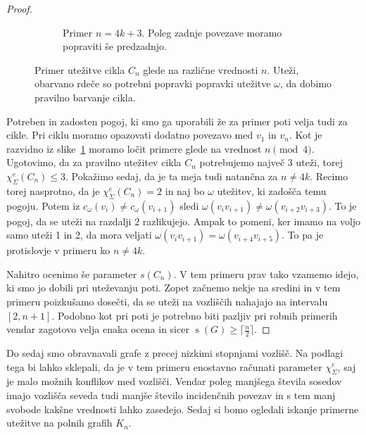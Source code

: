 \documentclass[12pt,a4paper,twoside]{article}
\theoremstyle{definition} %
\theoremstyle{plain} %
\newcommand{\ec}{\chi_{\Sigma}^e}
\numberwithin{equation}{section}  %
\DeclareMathOperator{\s}{s}
\begin{document}
\begin{proof}
\begin{figure}[]
\begin{subfigure}{0.475\textwidth}
		\caption{Primer $n = 4k + 3$. Poleg zadnje povezave moramo popraviti še predzadnjo.}
	\end{subfigure}
\caption{Primer utežitve cikla $C_n$ glede na različne vrednosti $n$. Uteži, obarvano rdeče so potrebni popravki popravki utežitve $\omega$, da dobimo pravilno barvanje cikla.}
\label{fig:cnall}
\end{figure}
Potreben in zadosten pogoj, ki smo ga uporabili že za primer poti velja tudi za cikle. Pri ciklu moramo opazovati dodatno povezavo med $v_1$ in $v_n$. Kot je razvidno iz slike~\ref{fig:cnall} moramo ločit primere glede na vrednost $n \pmod{4}$. Ugotovimo, da za pravilno utežitev cikla $C_n$ potrebujemo največ 3 uteži, torej $\ec(C_n) \le 3$. Pokažimo sedaj, da je ta meja tudi natančna za $n \neq 4k$. Recimo torej nasprotno, da je $\ec(C_n) = 2$ in naj bo $\omega$ utežitev, ki zadošča temu pogoju. Potem iz $c_{\omega}(v_i) \neq c_{\omega}(v_{i+1})$ sledi $\omega(v_i v_{i+1}) \neq \omega({v_{i+2} v_{i+3}})$. To je pogoj, da se uteži na razdalji $2$ razlikujejo. Ampak to pomeni, ker imamo na voljo samo uteži 1 in 2, da mora veljati $\omega(v_i v_{i+1}) = \omega({v_{i+4} v_{i+5}})$. To pa je protislovje v primeru ko $n \neq 4k$.

Nahitro ocenimo še parameter $s(C_n)$. V tem primeru prav tako vzamemo idejo, ki smo jo dobili pri uteževanju poti. Zopet začnemo nekje na sredini in v tem primeru poizkušamo dosečti, da se uteži na vozliščih nahajajo na intervalu $[2, n+1]$. Podobno kot pri poti je potrebno biti pazljiv pri robnih primerih vendar zagotovo velja enaka ocena in sicer $\s(G) \ge \lceil \frac{n}{2} \rceil$.
\end{proof}
Do sedaj smo obravnavali grafe z precej nizkimi stopnjami vozlišč. Na podlagi tega bi lahko sklepali, da je v tem primeru enostavno računati parameter $\ec$, saj je malo možnih konflikov med vozlišči. Vendar poleg manjšega števila sosedov imajo vozlišča seveda tudi manjše število incidenčnih povezav in s tem manj svobode kakšne vrednosti lahko zasedejo. Sedaj si bomo ogledali iskanje primerne utežitve na polnih grafih $K_n$. 
\end{document}
